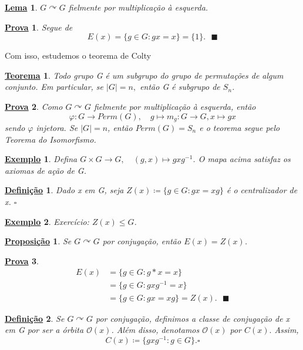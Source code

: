 \documentclass{article}
\newtheorem*{def*}{\underline{Defini\c c\~ao}}
\newtheorem*{prop*}{\underline{Proposi\c c\~ao}}
\newtheorem*{theorem*}{\underline{Teorema}}
\newtheorem{example*}{\underline{Exemplo}}
\newtheorem*{proof*}{\underline{Prova}}
\newtheorem*{lemma*}{\underline{Lema}}
\renewcommand\qedsymbol{$\blacksquare$}
\begin{document}
 \begin{lemma*}
   \(G \curvearrowright G\) fielmente por multiplica\c cão à esquerda.
 \end{lemma*}
\begin{proof*}
  Segue de 
    \[
      E(x) = \{g\in G: gx = x\} = \{1\}. \text{ \qedsymbol}
    \]
\end{proof*}
  Com isso, estudemos o teorema de Colty
\hypertarget{colty}{\begin{theorem*}
  Todo grupo G é um subgrupo do grupo de permuta\c cões de algum conjunto. Em particular,
  se \(|G| = n,\) então G é subgrupo de \(S_{n}\).
\end{theorem*}}
\begin{proof*}
  Como \(G \curvearrowright G\) fielmente por multiplica\c cão à esquerda, então 
    \[
      \varphi :G\rightarrow Perm(G),\quad g\mapsto m_{g}:G\rightarrow G, x\mapsto gx
    \]
    sendo \(\varphi \) injetora. Se \(|G|=n\), então \(Perm(G) = S_{n}\) e o teorema
    segue pelo Teorema do Isomorfismo.
\end{proof*}
\begin{example*}
  Defina \(G\times{G}\rightarrow G, \quad (g, x)\mapsto gxg^{-1}\). O mapa acima satisfaz
os axiomas de a\c cão de G.
\end{example*}
\begin{def*}
  Dado x em G, seja \(Z(x)\coloneqq \{g\in G: gx=xg\}\) é o centralizador de x. \(\square\)
\end{def*}
\begin{example*}
  Exercício: \(Z(x)\leq G\).
\end{example*}
\begin{prop*}
  Se \(G \curvearrowright G\) por conjuga\c cão, então \(E(x) = Z(x)\).
\end{prop*}
\begin{proof*}
 \begin{align*}
   E(x) &= \{g\in G: g * x = x\}\\
        &= \{g\in G: gxg^{-1} = x\}\\
        &= \{g\in G: gx = xg\} = Z(x).\text{ \qedsymbol}
 \end{align*}
\end{proof*}
\begin{def*}
  Se \(G \curvearrowright G\) por conjuga\c cão, definimos a classe de conjuga\c cão 
de x em G por ser a órbita \(\mathcal{O}(x)\). Além disso, denotamos \(\mathcal{O}(x)\) por 
 \(C(x).\) Assim, 
   \[
     C(x)\coloneqq \{gxg^{-1}: g\in G\}. \square
   \]
\end{def*}
\end{document}
